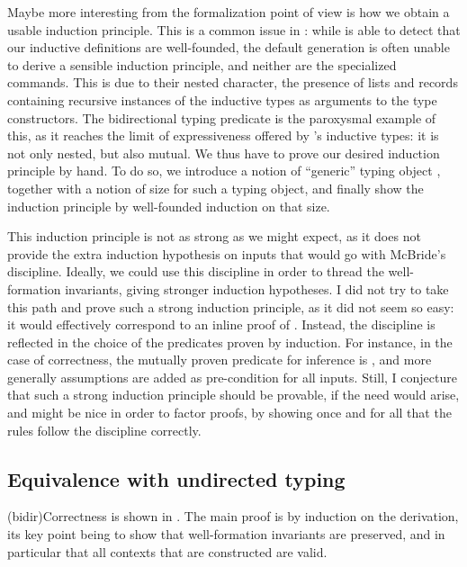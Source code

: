 Maybe more interesting from the formalization point of view is how we obtain a usable
induction principle. This is a common issue in : while
 is able to detect that our inductive definitions are well-founded,
the default generation is often unable to derive a sensible induction principle,
and neither are the  specialized commands. This is due to their nested
character, \ie the presence of lists and records containing recursive instances
of the inductive types as arguments to the type constructors.
The bidirectional typing predicate is the paroxysmal example of this, as it
reaches the limit of expressiveness offered by
’s inductive types: it is not only nested, but also mutual.
We thus have to prove our desired induction principle by
hand. To do so, we introduce a notion of “generic” typing object
,
together with a notion of size for such a typing object,
and finally show the induction principle
by well-founded induction on that size.

This induction principle is not as strong as we might expect, as it does not provide the extra induction hypothesis on inputs that would go with McBride's discipline.
Ideally, we could use this discipline
in order to thread the well-formation invariants, giving stronger induction
hypotheses. I did not try to take this path and prove such a strong induction principle,
as it did not seem so easy: it would effectively correspond to an inline proof
of .
Instead, the discipline is reflected in the choice of the predicates proven by induction.
For instance, in the case of correctness, the mutually proven predicate for inference
is , and more generally
assumptions are added as pre-condition for all inputs.
Still, I conjecture that such a strong induction principle should be provable, if the need
would arise, and might be nice in order to factor proofs, by showing once and for all that
the rules follow the discipline correctly.

\subsection{Equivalence with undirected typing}

\kl(bidir){Correctness}%
is shown in .
The main proof is by induction on the derivation,
its key point being to show that well-formation invariants are preserved, and in particular
that all contexts that are constructed are valid.


